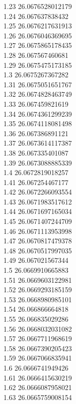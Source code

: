 {1.23	26.0676528012179\\
1.24	26.067637838432\\
1.25	26.0676217631913\\
1.26	26.0676046369695\\
1.27	26.0675865178435\\
1.28	26.067567460681\\
1.29	26.0675475173185\\
1.3	26.0675267367282\\
1.31	26.0675051651767\\
1.32	26.0674828463749\\
1.33	26.067459821619\\
1.34	26.0674361299239\\
1.35	26.0674118081498\\
1.36	26.067386891121\\
1.37	26.0673614117387\\
1.38	26.067335401087\\
1.39	26.0673088885339\\
1.4	26.0672819018257\\
1.41	26.067254467177\\
1.42	26.0672266093554\\
1.43	26.0671983517612\\
1.44	26.0671697165034\\
1.45	26.0671407244709\\
1.46	26.0671113953998\\
1.47	26.0670817479378\\
1.48	26.0670517997035\\
1.49	26.067021567344\\
1.5	26.0669910665883\\
1.51	26.0669603122981\\
1.52	26.0669293185159\\
1.53	26.0668980985101\\
1.54	26.066866664818\\
1.55	26.066835029286\\
1.56	26.0668032031082\\
1.57	26.0667711968619\\
1.58	26.0667390205423\\
1.59	26.0667066835941\\
1.6	26.0666741949426\\
1.61	26.0666415630219\\
1.62	26.0666087958021\\
1.63	26.0665759008154\\
}
